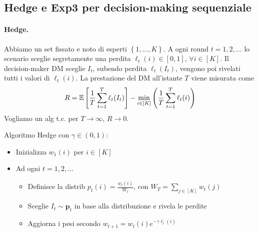 
\subsection{Hedge e Exp3 per decision-making sequenziale}

\paragraph{Hedge.} Abbiamo un set fissato e noto di esperti $\left\{1, \dots, K\right\}$. A ogni round $t = 1,2,\dots$ lo scenario sceglie segretamente una perdita $\ell_t (i) \in [0,1]$, $\forall i \in [K]$. Il decision-maker DM sceglie $I_t$, subendo perdita $\ell_t (I_t)$, vengono poi rivelati tutti i valori di $\ell_t (i)$. La prestazione del DM all'istante $T$ viene misurata come
$$ R = \mathbb{E} \left[\frac{1}{T} \sum_{t = 1}^T \ell_t (I_t)\right] - \min_{i \in [K]} \left(\frac{1}{T} \sum_{t = 1}^T \ell_t (i)\right) $$
Vogliamo un alg t.c. per $T \rightarrow \infty$, $R \rightarrow 0$.

Algoritmo Hedge con $\gamma \in (0,1)$:
\begin{itemize}
    \item Inizializza $w_1(i)$ per $i \in [K]$

    \item Ad ogni $t = 1,2, \dots$
    \begin{itemize}
        \item Definisce la distrib $p_t(i) = \frac{w_t (i)}{W_t}$, con $W_T = \sum_{j \in [K]} w_t(j)$

        \item Sceglie $I_t \sim \bm p_t$ in base alla distribuzione e rivela le perdite

        \item Aggiorna i pesi secondo $w_{t+1} = w_t (i) e^{-\gamma\ell_t(i)}$
    \end{itemize}
\end{itemize}

